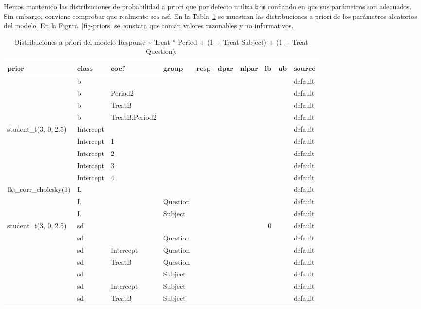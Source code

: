 \documentclass[
  12pt,
  a4paper,
  extrafontsizes,
  onecolumn,
  openright]{memoir}
\begin{document}
\normalsize

Hemos mantenido las distribuciones de probabilidad a priori que por
defecto utiliza \texttt{brm} confiando en que sus parámetros son
adecuados. Sin embargo, conviene comprobar que realmente sea así. En la
Tabla~\ref{tbl-priors} se muestran las distribuciones a priori de los
parámetros aleatorios del modelo. En la Figura~\ref{fig-priors} se
constata que toman valores razonables y no informativos.

\tiny

\hypertarget{tbl-priors}{}
\begin{longtable}{llllrrrrrl}
\caption{\label{tbl-priors}Distribuciones a priori del modelo Response \textasciitilde{} Treat *
Period + (1 + Treat \textbar{} Subject) + (1 + Treat \textbar{}
Question). }\tabularnewline

\toprule
prior & class & coef & group & resp & dpar & nlpar & lb & ub & source \\ 
\midrule
 & b &  &  &  &  &  &  &  & default \\ 
 & b & Period2 &  &  &  &  &  &  & default \\ 
 & b & TreatB &  &  &  &  &  &  & default \\ 
 & b & TreatB:Period2 &  &  &  &  &  &  & default \\ 
student\_t(3, 0, 2.5) & Intercept &  &  &  &  &  &  &  & default \\ 
 & Intercept & 1 &  &  &  &  &  &  & default \\ 
 & Intercept & 2 &  &  &  &  &  &  & default \\ 
 & Intercept & 3 &  &  &  &  &  &  & default \\ 
 & Intercept & 4 &  &  &  &  &  &  & default \\ 
lkj\_corr\_cholesky(1) & L &  &  &  &  &  &  &  & default \\ 
 & L &  & Question &  &  &  &  &  & default \\ 
 & L &  & Subject &  &  &  &  &  & default \\ 
student\_t(3, 0, 2.5) & sd &  &  &  &  &  & 0 &  & default \\ 
 & sd &  & Question &  &  &  &  &  & default \\ 
 & sd & Intercept & Question &  &  &  &  &  & default \\ 
 & sd & TreatB & Question &  &  &  &  &  & default \\ 
 & sd &  & Subject &  &  &  &  &  & default \\ 
 & sd & Intercept & Subject &  &  &  &  &  & default \\ 
 & sd & TreatB & Subject &  &  &  &  &  & default \\ 
\bottomrule
\end{longtable}
\end{document}
